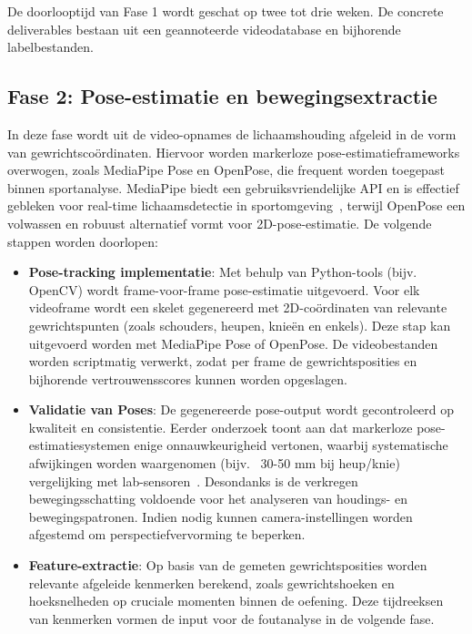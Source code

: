 De doorlooptijd van Fase 1 wordt geschat op twee tot drie weken. De concrete deliverables bestaan uit een geannoteerde videodatabase en bijhorende labelbestanden.

\subsection{Fase 2: Pose-estimatie en bewegingsextractie}

In deze fase wordt uit de video-opnames de lichaamshouding afgeleid in de vorm van gewrichtscoördinaten. Hiervoor worden markerloze pose-estimatieframeworks overwogen, zoals MediaPipe Pose en OpenPose, die frequent worden toegepast binnen sportanalyse. MediaPipe biedt een gebruiksvriendelijke API en is effectief gebleken voor real-time lichaamsdetectie in sport\-omgeving\newline~\autocite{Lyu2025}, terwijl OpenPose een volwassen en robuust alternatief vormt voor 2D-pose-estimatie. De volgende stappen worden doorlopen:

\begin{itemize}
    \item \textbf{ Pose-tracking implementatie}: Met behulp van Python-tools (bijv. OpenCV) wordt frame-voor-frame pose-estimatie uitgevoerd. Voor elk videoframe wordt een skelet gegenereerd met 2D-coördinaten van relevante gewrichtspunten (zoals schouders, heupen, knieën en enkels). Deze stap kan uitgevoerd worden met MediaPipe Pose of OpenPose. De videobestanden worden scriptmatig verwerkt, zodat per frame de gewrichtsposities en bijhorende vertrouwensscores kunnen worden opgeslagen.
    \item \textbf{Validatie van Poses}: De gegenereerde pose-output wordt gecontroleerd op kwaliteit en consistentie. Eerder onderzoek toont aan dat markerloze pose-estimatiesystemen enige onnauwkeurigheid vertonen, waarbij systematische afwijkingen worden waargenomen (bijv. ~30-50 mm bij heup/knie) vergelijking met lab-sensoren~\autocite{Needham2021}. Desondanks is de verkregen bewegingsschatting voldoende voor het analyseren van houd\-ings- en bewegingspatronen. Indien nodig kunnen camera-instellingen worden afgestemd om perspectiefvervorming te beperken.
    \item \textbf{Feature-extractie}: Op basis van de gemeten gewrichtsposities worden relevante afgeleide kenmerken berekend, zoals gewrichtshoeken en hoeksnelheden op cruciale momenten binnen de oefening. Deze tijdreeksen van kenmerken vormen de input voor de foutanalyse in de volgende fase.
\end{itemize}

